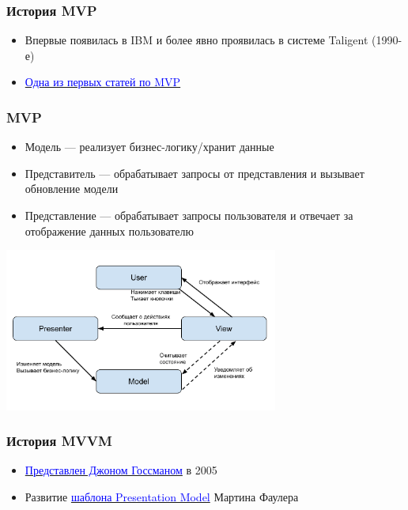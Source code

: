 \documentclass[aspectratio=169]{beamer}
\begin{document}
\begin{frame}[fragile]
  \transwipe[direction=90]
  \frametitle{История MVP}
  \begin{itemize}
    \item Впервые появилась в IBM и более явно проявилась в системе Taligent  (1990-е)
    \item \href{http://www.wildcrest.com/Potel/Portfolio/mvp.pdf}{\textcolor{blue}{Одна из первых статей по MVP}}
  \end{itemize}
\end{frame}

\begin{frame}[fragile]
  \transwipe[direction=90]
  \frametitle{MVP}
  \begin{minipage}{.4\textwidth}
    \begin{itemize}
      \item Модель --- реализует бизнес-логику/хранит данные
      \item Представитель --- обрабатывает запросы от представления и вызывает обновление модели
      \item Представление --- обрабатывает запросы пользователя и отвечает за отображение данных пользователю
    \end{itemize}
  \end{minipage}
  \begin{minipage}{.56\textwidth}
    \includegraphics[width=9cm]{pictures/MVP.pdf}
  \end{minipage}
\end{frame}

\begin{frame}[fragile]
  \transwipe[direction=90]
  \frametitle{История MVVM}
  \begin{itemize}
    \item \href{https://learn.microsoft.com/en-us/archive/blogs/johngossman/introduction-to-modelviewviewmodel-pattern-for-building-wpf-apps}{\textcolor{blue}{Представлен Джоном Госсманом}} в 2005
    \item Развитие \href{https://martinfowler.com/eaaDev/PresentationModel.html}{\textcolor{blue}{шаблона Presentation Model}} Мартина Фаулера
  \end{itemize}
\end{frame}
\end{document}
